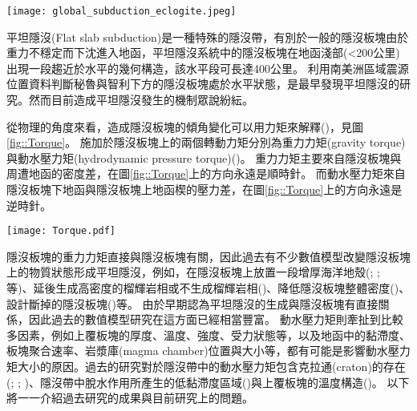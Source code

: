 \begin{figure*}[ht!]
    \centering
    \texttt{[image: global\_subduction\_eclogite.jpeg]}
    \caption{
    全球隱沒板塊頂部的預測P-T路徑圖，摘自\citealp{penniston2015global}。圖中標示每公里5$^\circ$、10$^\circ$、20$^\circ$的地溫梯度與藍閃岩、榴輝岩溫壓位置。(A)來自\citealp{syracuse2010global}的全球隱沒板塊P-T路徑圖(紫色線)。(B)來自\citealp{gerya2002exhumation}的模型，紅色線代表不同年齡的隱沒板塊P-T路徑圖。
    }
    \label{fig::global_subduction_eclogite}
\end{figure*}


平坦隱沒(Flat slab subduction)是一種特殊的隱沒帶，有別於一般的隱沒板塊由於重力不穩定而下沈進入地函，平坦隱沒系統中的隱沒板塊在地函淺部(<200公里)出現一段趨近於水平的幾何構造，該水平段可長達400公里。
\citealp{barazangi1976}利用南美洲區域震源位置資料判斷秘魯與智利下方的隱沒板塊處於水平狀態，是最早發現平坦隱沒的研究。然而目前造成平坦隱沒發生的機制眾說紛紜。

從物理的角度來看，造成隱沒板塊的傾角變化可以用力矩來解釋(\citealp{stevenson1977angle})，見圖\ref{fig::Torque}。
施加於隱沒板塊上的兩個轉動力矩分別為重力力矩(gravity torque)與動水壓力矩(hydrodynamic pressure torque)(\citealp{McKenzie1969})。
重力力矩主要來自隱沒板塊與周遭地函的密度差，在圖\ref{fig::Torque}上的方向永遠是順時針。
而動水壓力矩來自隱沒板塊下地函與隱沒板塊上地函楔的壓力差，在圖\ref{fig::Torque}上的方向永遠是逆時針。

\begin{figure*}[ht!]
    \centering
    \texttt{[image: Torque.pdf]}
    \caption{隱沒系統中的施加於隱沒板塊上的轉動力矩，包含重力力矩與水壓力矩
    }
    \label{fig::Torque}
\end{figure*}

隱沒板塊的重力力矩直接與隱沒板塊有關，因此過去有不少數值模型改變隱沒板塊上的物質狀態形成平坦隱沒，例如，在隱沒板塊上放置一段增厚海洋地殼(\citealp{van2002role}; \citealp{Liu2016}; \citealp{Hu2016}等)、延後生成高密度的榴輝岩相或不生成榴輝岩相(\citealp{van2002role})、降低隱沒板塊整體密度(\citealp{Gerya2009})、設計斷掉的隱沒板塊(\citealp{Liu2016})等。
由於早期認為平坦隱沒的生成與隱沒板塊有直接關係，因此過去的數值模型研究在這方面已經相當豐富。
動水壓力矩則牽扯到比較多因素，例如上覆板塊的厚度、溫度、強度、受力狀態等，以及地函中的黏滯度、板塊聚合速率、岩漿庫(magma chamber)位置與大小等，都有可能是影響動水壓力矩大小的原因。過去的研究對於隱沒帶中的動水壓力矩包含克拉通(craton)的存在(\citealp{Manea2012Chile}; \citealp{Liu2016}; \citealp{Hu2016})、隱沒帶中脫水作用所產生的低黏滯度區域(\citealp{Manea2007})與上覆板塊的溫度構造(\citealp{Thermal2012})。
以下將一一介紹過去研究的成果與目前研究上的問題。

